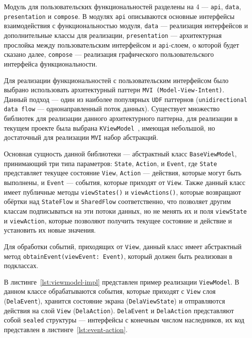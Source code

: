 \documentclass[14pt, russian]{scrartcl}
\begin{document}

Модуль для пользовательских функциональностей разделены на 4 --- \texttt{api}, \texttt{data}, \texttt{presentation} и \texttt{compose}. В модулях \texttt{api} описываются основные интерфейсы взаимодействия с функциональностью модуля, \texttt{data} --- реализация интерфейсов и дополнительные классы для реализации, \texttt{presentation} --- архитектурная прослойка между пользовательским интерфейсом и \texttt{api}-слоем, о которой будет сказано далее, \texttt{compose} --- реализация графического пользовательского интерфейса функциональности.

Для реализации функциональностей с пользовательским интерфейсом было выбрано использовать архитектурный паттерн \texttt{MVI (Model-View-Intent)}. Данный подход --- один из наиболее популярных \texttt{UDF} паттернов (\texttt{unidirectional data flow} --- однонаправленный поток данных). Существует множество библиотек для реализации данного архитектурного паттерна, для реализации в текущем проекте была выбрана \texttt{KViewModel}~\cite{kvmodel}, имеющая небольшой, но достаточный для реализации \texttt{MVI} набор абстракций. 

Основная сущность данной библиотеки --- абстрактный класс \texttt{BaseViewModel}, принимающий три типа параметров: \texttt{State}, \texttt{Action}, и \texttt{Event}, где \texttt{State} представляет текущее состояние \texttt{View}, \texttt{Action} --- действия, которые могут быть выполнены, и \texttt{Event} --- события, которые приходят от \texttt{View}. Также данный класс имеет публичные методы \texttt{viewStates()} и \texttt{viewActions()}, которые возвращают обёртки над \texttt{StateFlow} и \texttt{SharedFlow} соответственно, что позволяет другим классам подписываться на эти потоки данных, но не менять их и поля \texttt{viewState} и \texttt{viewAction}, которые позволяют получить текущее состояние и действие и установить их новые значения.

Для обработки событий, приходящих от \texttt{View}, данный класс имеет абстрактный метод \texttt{obtainEvent(viewEvent: Event)}, который должен быть реализован в подклассах.

В листинге~\ref{lst:viewmodel-impl} представлен пример реализации \texttt{ViewModel}. В данном классе обрабатываются события, которые приходят с \texttt{View} слоя (\texttt{DelaEvent}), хранится состояние экрана (\texttt{DelaViewState}) и отправляются действия на слой \texttt{View} (\texttt{DelaAction}). \texttt{DelaEvent} и \texttt{DelaAction} представляют собой \texttt{sealed} структуры --- интерфейсы с конечным числом наследников, их код представлен в листинге~\ref{lst:event-action}.
\end{document}
